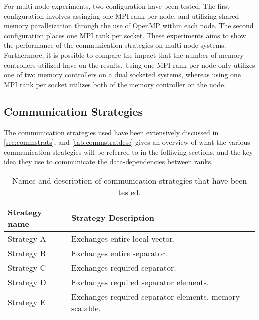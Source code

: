For multi node experiments, two configuration have been tested. The first configuration involves assinging one MPI rank per node, and utilizing shared memory paralleization through the use of OpenMP within each node. The second configuration places one MPI rank per socket. These experiments aims to show the performance of the communication strategies on multi node systems. Furthermore, it is possible to compare the impact that the number of memory controllers utilized have on the results. Using one MPI rank per node only utilizes one of two memory controllers on a dual socketed systems, whereas using one MPI rank per socket utilizes both of the memory controller on the node.



\subsection{Communication Strategies}
The communication strategies used have been extensively discussed in \ref{sec:commstrats}, and \autoref{tab:commstratdesc} gives an overview of what the various communication strategies will be referred to in the folliwing sections, and the key idea they use to communicate the data-dependencies between ranks.

\begin{table}[H]
    \caption{Names and description of communication strategies that have been tested.}
    \label{tab:commstratdesc}
    \begin{center}
        \begin{tabular}[c]{|p{3cm}|p{8.5cm}|}
            \hline
             \textbf{Strategy name}& \textbf{Strategy Description}  \\
            \hline
             Strategy A&Exchanges entire local vector.  \\
            \hline
             Strategy B&Exchanges entire separator.  \\
            \hline
             Strategy C&Exchanges required separator.  \\
            \hline
             Strategy D&Exchanges required separator elements.  \\
            \hline
             Strategy E&Exchanges required separator elements, memory scalable.  \\
            \hline
        \end{tabular}
    \end{center}
\end{table}


